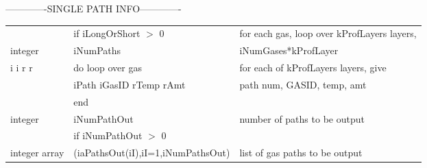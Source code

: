 \documentclass[12pt]{article}
\newlength{\colwidth}
\begin{document}
{{{{-------------SINGLE PATH INFO-------------\\
\begin{small}
\begin{longtable}{llp{\colwidth}}
                 & if iLongOrShort $>$ 0   & for each gas, loop over kProfLayers 
                                             layers,\\
{\sf integer}    & \indent iNumPaths               & iNumGases*kProfLayer\\
{\sf i i r r}    &\indent do loop over gas & for each of kProfLayers layers, give \\
                 &\indent \indent iPath iGasID rTemp rAmt 
                                           & path num, GASID, temp, amt\\
                 &\indent \indent end              &  \\
{\sf integer}    &iNumPathOut              & number of paths to be output\\
                 & if iNumPathOut $>$ 0    & \\
{\sf integer array} &\indent (iaPathsOut(iI),iI=1,iNumPathsOut) & 
list of gas paths to be output\\
\end{longtable}
\end{small}

}}}}
\end{document}
